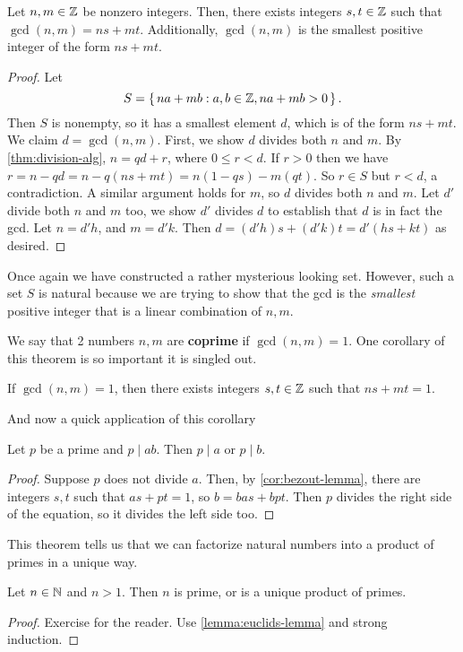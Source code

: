 \documentclass[./main.tex]{subfiles}
\begin{document}
\begin{theorem}
\label{thm:gcd-is-linear-combination}
    Let $n, m \in \mathbb{Z}$ be nonzero integers. Then, there exists integers $s, t
    \in \mathbb{Z}$ such that $\gcd(n, m) = ns + mt$. Additionally, $\gcd(n,m)$ is the
    smallest positive integer of the form $ns + mt$.
\end{theorem}
\begin{proof}
    Let 
    \[
    S = \set{na + mb : a, b \in \mathbb{Z}, na + mb > 0}.
    \]
    Then $S$ is nonempty, so it has a smallest element $d$, which is of the form
    $ns + mt$. We claim $d = \gcd(n, m)$. First, we show $d$ divides both $n$
    and $m$. By \cref{thm:division-alg}, $n = qd + r$, where $0 \leq r < d$. If
    $r > 0$ then we have $r = n - qd = n - q(ns+mt) = n(1-qs) - m(qt)$. So $r
    \in S$ but $r < d$, a contradiction. A similar argument holds for $m$, so
    $d$ divides both $n$ and $m$. Let $d'$ divide both $n$ and $m$ too, we show
    $d'$ divides $d$ to establish that $d$ is in fact the gcd. Let $n = d'h$,
    and $m = d'k$. Then $d = (d'h)s + (d'k)t = d'(hs + kt)$ as desired.
\end{proof}
Once again we have constructed a rather mysterious looking set. However, such a
set $S$ is natural because we are trying to show that the gcd is the
\emph{smallest} positive integer that is a linear combination of $n, m$. 

We say that 2 numbers $n, m$ are \textbf{coprime} if $\gcd(n, m) = 1$. One
corollary of this theorem is so important it is singled out. 
\begin{corollary}
\label{cor:bezout-lemma}
    If $\gcd(n, m) = 1$, then there exists integers $s, t \in \mathbb{Z}$ such that $ns + mt = 1$. 
\end{corollary}

And now a quick application of this corollary

\begin{lemma}
\label{lemma:euclids-lemma}
    Let $p$ be a prime and $p \mid ab$. Then $p \mid a$ or $p \mid b$.
\end{lemma}
\begin{proof}
    Suppose $p$ does not divide $a$. Then, by \cref{cor:bezout-lemma}, there are
    integers $s,t$ such that $as+pt = 1$, so $b = bas + bpt$. Then $p$ divides
    the right side of the equation, so it divides the left side too.
\end{proof}

This theorem tells us that we can factorize natural numbers into a product of
primes in a unique way.
\begin{theorem}
\label{thm:fundamental-theorem-of-arthmetic}
    Let $n \in \mathbb{N}$ and $n > 1$. Then $n$ is prime, or is a unique product of
    primes. 
\end{theorem}
\begin{proof}
    Exercise for the reader. Use \cref{lemma:euclids-lemma} and strong induction. 
\end{proof}
\end{document}
